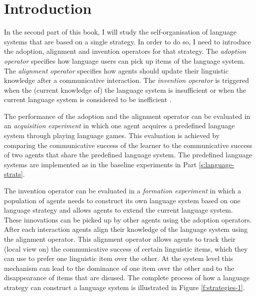\section*{Introduction}

\addtocounter{chapter}{1}
\setcounter{figure}{0}

In the second part of this book, I will study the self-organisation of
language systems that are based on a single strategy. In order to do
so, I need to introduce the adoption, alignment and invention
operators for that strategy. The \emph{adoption operator} specifies how language users can pick up items of the language
system. The \emph{alignment operator}
specifies how agents should
update their linguistic knowledge after a communicative
interaction. The \emph{invention operator}
is triggered when the
(current knowledge of) the language system is insufficient or when the
current language system is considered to be inefficient
\citep{steels06how}.

The performance of the adoption and the alignment operator can be
evaluated in an \emph{acquisition experiment} 
in which one agent
acquires a predefined language system through playing language games.
This evaluation is achieved by comparing the communicative success of the
learner to the communicative success of two agents that share the
predefined language system. The predefined language systems are
implemented as in the baseline experiments in Part
\ref{s:language-strats}.

The invention operator can be evaluated in a \emph{formation
  experiment} in which a population of
agents needs to construct its own language system based on one
language strategy and allows agents to extend the current language
system. These innovations can be picked up by other agents using the
adoption operators. After each interaction agents align their
knowledge of the language system using the alignment operator. This
alignment operator allows agents to track their (local view on) the
communicative success of certain linguistic items, which they can use
to prefer one linguistic item over the other. At the system level this
mechanism can lead to the dominance of one item over the other and to
the disappearance of items that are disused. The complete process of
how a language strategy can construct a language system is illustrated
in Figure \ref{f:strategies-1}.\enlargethispage{3\baselineskip}

